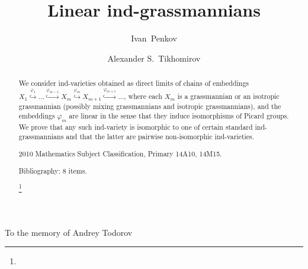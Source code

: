 \documentclass[12pt]{amsart}
\renewcommand{\phi}{\varphi}
\theoremstyle{definition}
\begin{document}
\begin{flushright}
To the memory of Andrey Todorov
\end{flushright}

\title{Linear ind-grassmannians}

\author[I.~Penkov]{\;Ivan~Penkov}

\vspace{1cm}

\address{
Jacobs University Bremen \\
School of Engineering and Science, Campus Ring 1, 28759 Bremen, Germany}

\author[A.~Tikhomirov]{\;Alexander S.~Tikhomirov}


\address{
Department of Mathematics\\
State Pedagogical University\\
Respublikanskaya Str. 108
 000 Yaroslavl, Russia}







\maketitle


\thispagestyle{empty}

\begin{abstract}
We consider ind-varieties obtained as direct limits of chains of embeddings
$X_1\stackrel{\phi_1}{\hookrightarrow}\dots\stackrel{\phi_{m-1}}{\hookrightarrow}
X_m\stackrel{\phi_m}{\hookrightarrow}X_{m+1}\stackrel{\phi_{m+1}}{\hookrightarrow}\dots$,
where each $X_m$ is a grassmannian or an isotropic grassmannian (possibly mixing grassmannians and isotropic
grassmannians), and the embeddings $\phi_m$ are linear in the sense that they induce
isomorphisms of Picard groups. We prove that any such ind-variety is isomorphic to one of certain standard
ind-grassmannians and that the latter are pairwise non-isomorphic ind-varieties.



2010 Mathematics Subject Classification, Primary 14A10, 14M15.

Bibliography: 8 items.


\thanks{}
\end{abstract}
\end{document}
